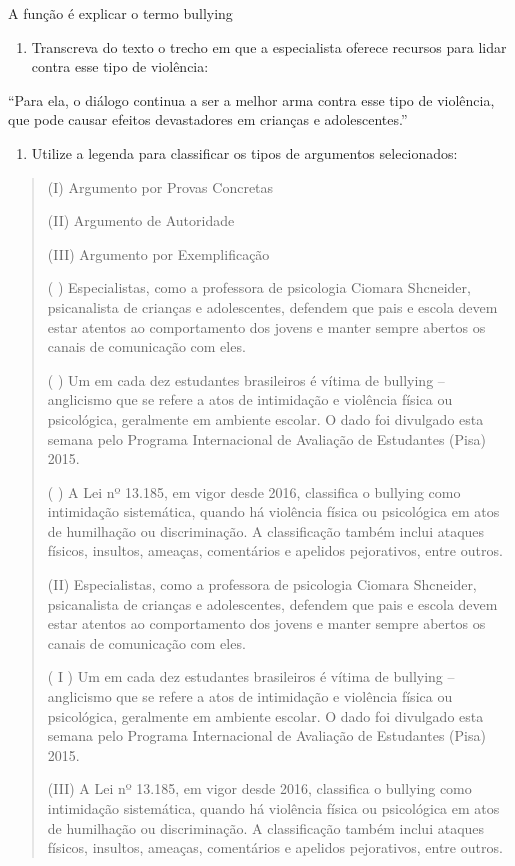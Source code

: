 A função é explicar o termo bullying

\begin{enumerate}
\def\labelenumi{\arabic{enumi})}
\setcounter{enumi}{3}
\tightlist
\item
  Transcreva do texto o trecho em que a especialista oferece recursos
  para lidar contra esse tipo de violência:
\end{enumerate}

``Para ela, o diálogo continua a ser a melhor arma contra esse tipo de
violência, que pode causar efeitos devastadores em crianças e
adolescentes.''

\begin{enumerate}
\def\labelenumi{\arabic{enumi})}
\setcounter{enumi}{4}
\tightlist
\item
  Utilize a legenda para classificar os tipos de argumentos
  selecionados:
\end{enumerate}

\begin{quote}
(I) Argumento por Provas Concretas

(II) Argumento de Autoridade

(III) Argumento por Exemplificação

( ) Especialistas, como a professora de psicologia Ciomara Shcneider,
psicanalista de crianças e adolescentes, defendem que pais e escola
devem estar atentos ao comportamento dos jovens e manter sempre abertos
os canais de comunicação com eles.

( ) Um em cada dez estudantes brasileiros é vítima de bullying --
anglicismo que se refere a atos de intimidação e violência física ou
psicológica, geralmente em ambiente escolar. O dado foi divulgado esta
semana pelo Programa Internacional de Avaliação de Estudantes (Pisa)
2015.

( ) A Lei nº 13.185, em vigor desde 2016, classifica o bullying como
intimidação sistemática, quando há violência física ou psicológica em
atos de humilhação ou discriminação. A classificação também inclui
ataques físicos, insultos, ameaças, comentários e apelidos pejorativos,
entre outros.

(II) Especialistas, como a professora de psicologia Ciomara Shcneider,
psicanalista de crianças e adolescentes, defendem que pais e escola
devem estar atentos ao comportamento dos jovens e manter sempre abertos
os canais de comunicação com eles.

( I ) Um em cada dez estudantes brasileiros é vítima de bullying --
anglicismo que se refere a atos de intimidação e violência física ou
psicológica, geralmente em ambiente escolar. O dado foi divulgado esta
semana pelo Programa Internacional de Avaliação de Estudantes (Pisa)
2015.

(III) A Lei nº 13.185, em vigor desde 2016, classifica o bullying como
intimidação sistemática, quando há violência física ou psicológica em
atos de humilhação ou discriminação. A classificação também inclui
ataques físicos, insultos, ameaças, comentários e apelidos pejorativos,
entre outros.
\end{quote}

